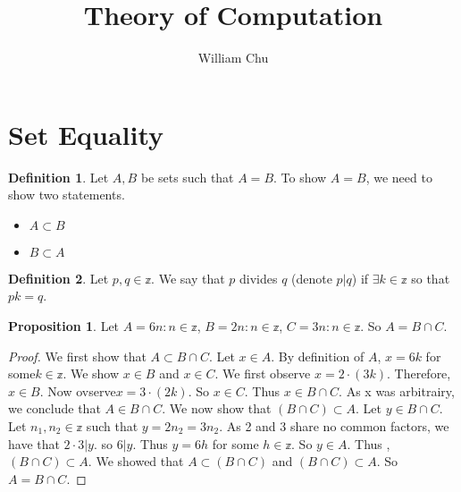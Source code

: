\documentclass{article}
\theoremstyle{definition}
\newtheorem{define}{Definition}[section]
\newtheorem{prop}{Proposition}[section]
\begin{document}
 

\title{Theory of Computation} 
\author{William Chu} 
\maketitle 

\section{Set Equality}

\begin{define}
Let $A,B$ be sets such that $A=B$. To show $A=B$, we need to show two statements.
	\begin{itemize}
		\item $A\subset B$
		\item $B\subset A$
	\end{itemize}
\end{define}

\begin{define}
Let $p,q \in \mathbb{z}$. We say that $p$ divides $q$ (denote $p|q$) if $\exists k \in \mathbb{z}$ so that $pk=q$. 
\end{define}

\begin{prop}
Let $A = {6n: n\in \mathbb{z}}$, $B={2n: n\in \mathbb{z}}$, $C={3n: n\in \mathbb{z}}$. So $A= B\cap C$.
\end{prop}
\begin{proof}
We first show that $A \subset B\cap C$. Let $x \in A$. By definition of $A$, $x =6k$ for some$ k \in \mathbb{z}$. We show $x \in B$ and $x \in C$. We first observe $x = 2\cdot(3k)$. Therefore, $x \in B$. Now ovserve$ x = 3\cdot(2k)$. So $x \in C$. Thus $x \in B\cap C$. As x was arbitrairy, we conclude that $A \in B\cap C$. We now show that $(B\cap C)\subset A$. Let $y \in B\cap C$. Let $n_1, n_2 \in \mathbb{z}$ such that $y=2n_2 = 3n_2$. As 2 and 3 share no common factors, we have that $2\cdot 3|y$. so $6|y$. Thus $y = 6h$ for some $h \in \mathbb{z}$. So $y \in A$. Thus , $(B\cap C) \subset A$. We showed that $A \subset (B\cap C)$ and $(B\cap C)\subset A$. So $A= B\cap C$.
\end{proof}
\end{document}
